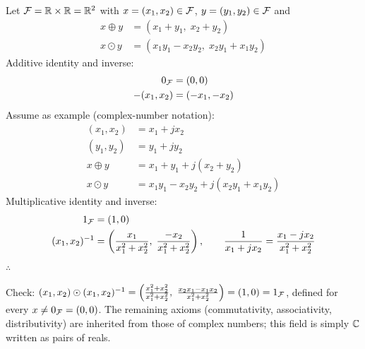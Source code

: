 \begin{example}
Let $\mathcal{F}=\mathbb{R}\times\mathbb{R}=\mathbb{R}^2$ with $x = (x_1,x_2)\in\mathcal{F}$, $y = (y_1,y_2)\in\mathcal{F}$ and
\begin{align*}
x\oplus y &= (x_1+y_1,\; x_2+y_2)\\
x\odot y &= (x_1y_1-x_2y_2,\; x_2y_1+x_1y_2)
\end{align*}
Additive identity and inverse:
\begin{align*}
0_{\mathcal{F}} &= (0,0)\\
-(x_1,x_2) &= (-x_1,-x_2)
\end{align*}
Assume as example (complex-number notation):
\begin{align*}
(x_1,x_2) &= x_1+jx_2\\
(y_1,y_2) &= y_1+jy_2\\[2pt]
x\oplus y &= x_1+y_1+j(x_2+y_2)\\
x\odot y &= x_1y_1-x_2y_2+j(x_2y_1+x_1y_2)
\end{align*}
Multiplicative identity and inverse:
\begin{align*}
1_{\mathcal{F}} &= (1,0)\\
(x_1,x_2)^{-1} &= \left(\frac{x_1}{x_1^2+x_2^2},\; \frac{-x_2}{x_1^2+x_2^2}\right),
\qquad \frac{1}{x_1+jx_2} = \frac{x_1-jx_2}{x_1^2+x_2^2}
\end{align*}
$\therefore$ 
\begin{insight}
Check: $(x_1,x_2)\odot(x_1,x_2)^{-1} = \left(\frac{x_1^2+x_2^2}{x_1^2+x_2^2},\ \frac{x_2x_1-x_1x_2}{x_1^2+x_2^2}\right) = (1,0)=\1$, defined for every $x\neq0_{\mathcal{F}}=(0,0)$. The remaining axioms (commutativity, associativity, distributivity) are inherited from those of complex numbers; this field is simply $\mathbb{C}$ written as pairs of reals.
\end{insight}
\end{example}

